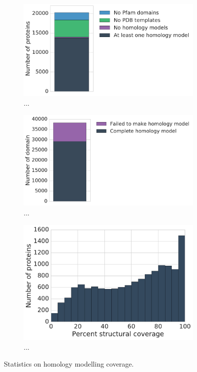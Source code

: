 \begin{figure}[ht]
	\centering

	\begin{subfigure}[t]{0.5\textwidth}
		\centering
		\includegraphics[width=1\linewidth]{static/elaspic_training_set/elaspic_statistics/protein_statistics.pdf}
		\caption{...}
		\vspace*{10mm}
	\end{subfigure}%
	\begin{subfigure}[t]{0.5\textwidth}
		\centering
		\includegraphics[width=1\linewidth]{static/elaspic_training_set/elaspic_statistics/domain_statistics.pdf}
		\caption{...}
		\vspace*{10mm}
	\end{subfigure}

	\begin{subfigure}{1.0\textwidth}
		\centering
		\includegraphics[width=0.55\linewidth]{static/elaspic_training_set/elaspic_statistics/structural_coverage_hist.pdf}
		\caption{...}
	\end{subfigure}%
	\caption{Statistics on homology modelling coverage.}

\end{figure}


